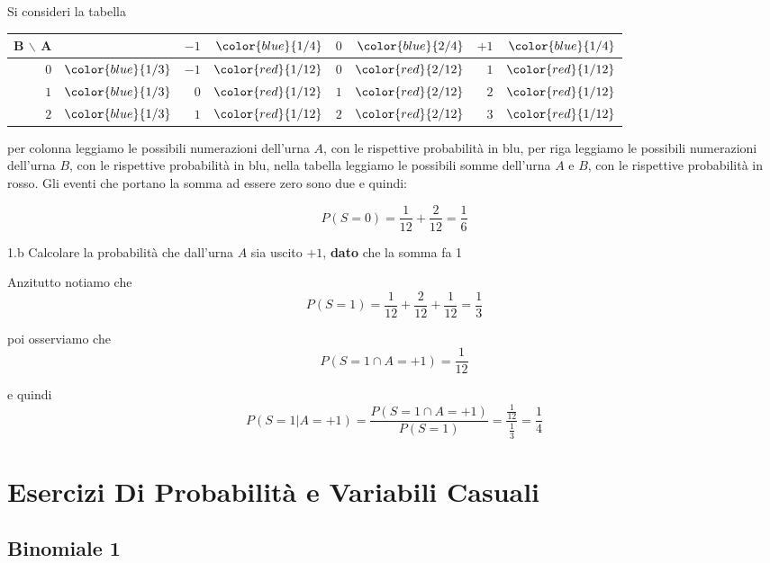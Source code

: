 \documentclass[
  11pt,
]{book}
\theoremstyle{mytheoremstyle}
\theoremstyle{mydefstyle}
\newenvironment{sol}
  {
  \begin{tcolorbox}[enhanced,breakable,arc=0.1mm,boxrule=1pt,colback=white,colframe=iblue,
  title=\bf \fontfamily{lmss}\selectfont \hspace{.5 cm} Soluzione,drop fuzzy shadow]

}{
\end{tcolorbox}
  }
\begin{document}
\begin{sol}
Si consideri la tabella

\begin{tabular}{r>{}r|rrrrrr}
\toprule
B $\backslash$ A &  & $-1$ & $\color{blue}{1/4}$ & $0$ & $\color{blue}{2/4}$ & $+1$ & $\color{blue}{1/4}$\\
\midrule
$0$ & $\color{blue}{1/3}$ & $-1$ & $\color{red}{1/{12}}$ & $0$ & $\color{red}{2/{12}}$ & $1$ & $\color{red}{1/{12}}$\\
$1$ & $\color{blue}{1/3}$ & $0$ & $\color{red}{1/{12}}$ & $1$ & $\color{red}{2/{12}}$ & $2$ & $\color{red}{1/{12}}$\\
$2$ & $\color{blue}{1/3}$ & $1$ & $\color{red}{1/{12}}$ & $2$ & $\color{red}{2/{12}}$ & $3$ & $\color{red}{1/{12}}$\\
\bottomrule
\end{tabular}

per colonna leggiamo le possibili numerazioni dell'urna \(A\), con le rispettive probabilità in blu,
per riga leggiamo le possibili numerazioni dell'urna \(B\), con le rispettive probabilità in blu,
nella tabella leggiamo le possibili somme dell'urna \(A\) e \(B\), con le rispettive probabilità in rosso.
Gli eventi che portano la somma ad essere zero sono due e quindi:

\[
P(S=0)=\frac 1{12}+\frac 2{12}=\frac 16
\]

\end{sol}

1.b Calcolare la probabilità che dall'urna \(A\) sia uscito \(\mbox{+1}\), \textbf{dato} che
la somma fa 1

\begin{sol}
Anzitutto notiamo che
\[
P(S=1)=\frac1{12}+\frac2{12}+\frac1{12}=\frac13
\]

poi osserviamo che
\[
P(S=1\cap A=\mbox{+1})=\frac1{12}
\]

e quindi
\[
P(S=1|A=\mbox{+1})=\frac{P(S=1\cap A=\mbox{+1})}{P(S=1)}=\frac{\frac{1}{12}}{\frac13}=\frac14
\]

\end{sol}

\chapter{Esercizi Di Probabilità e Variabili Casuali}\label{esercizi-di-probabilituxe0-e-variabili-casuali}

\section{Binomiale 1}\label{binomiale-1}
\end{document}

